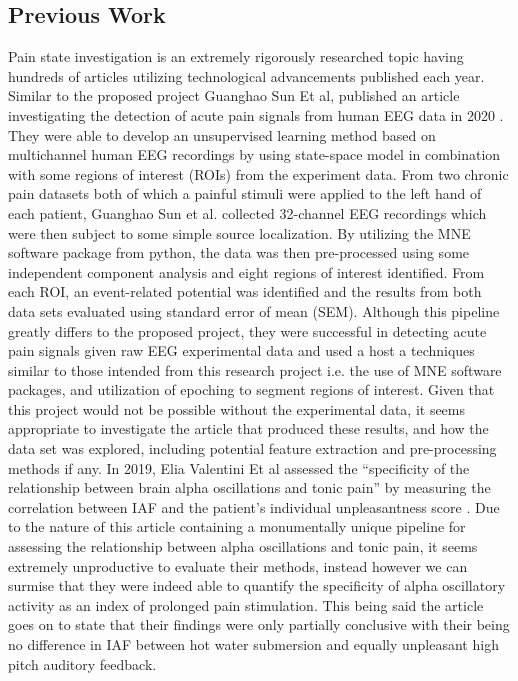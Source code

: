 \documentclass[12pt]{article}
\begin{document}
\subsection{Previous Work}
Pain state investigation is an extremely rigorously researched topic having hundreds of articles utilizing technological advancements published each year. Similar to the proposed project Guanghao Sun Et al, published an article investigating the detection of acute pain signals from human EEG data in 2020 \cite{SUN2021108964}. They were able to develop an unsupervised learning method based on multichannel human EEG recordings by using state-space model in combination with some regions of interest (ROIs) from the experiment data. From two chronic pain datasets both of which a painful stimuli were applied to the left hand of each patient, Guanghao Sun et al. collected 32-channel EEG recordings which were then subject to some simple source localization. By utilizing the MNE \cite{GramfortEtAl2013a} software package from python, the data was then pre-processed using some independent component analysis and eight regions of interest identified. From each ROI, an event-related potential was identified and the results from both data sets evaluated using standard error of mean (SEM). Although this pipeline greatly differs to the proposed project, they were successful in detecting acute pain signals given raw EEG experimental data and used a host a techniques similar to those intended from this research project i.e. the use of MNE software packages, and utilization of epoching to segment regions of interest. 
Given that this project would not be possible without the experimental data, it seems appropriate to investigate the article that produced these results, and how the data set was explored, including potential feature extraction and pre-processing methods if any. In 2019, Elia Valentini Et al assessed the “specificity of the relationship between brain alpha oscillations and tonic pain” by measuring the correlation between IAF and the patient’s individual unpleasantness score \cite{Valentini787283}. Due to the nature of this article containing a monumentally unique pipeline for assessing the relationship between alpha oscillations and tonic pain, it seems extremely unproductive to evaluate their methods, instead however we can surmise that they were indeed able to quantify the specificity of alpha oscillatory activity as an index of prolonged pain stimulation. This being said the article goes on to state that their findings were only partially conclusive with their being no difference in IAF between hot water submersion and equally unpleasant high pitch auditory feedback.
\end{document}

